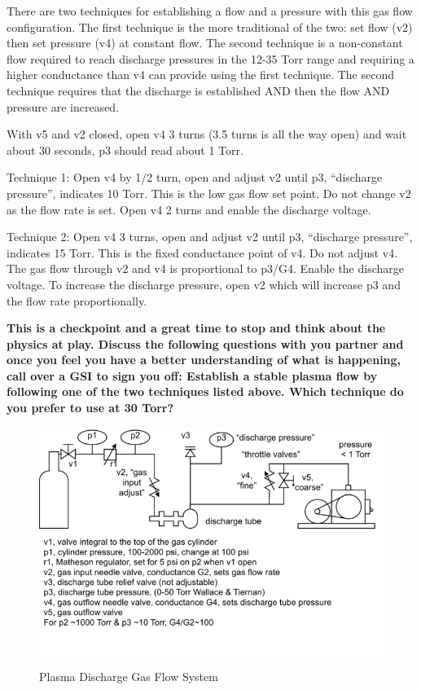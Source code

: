 \documentclass{../lab}
\begin{document}
There are two techniques for establishing a flow and a pressure with this gas flow configuration. The first technique is the more traditional of the two: set flow (v2) then set pressure (v4) at constant flow. The second technique is a non-constant flow required to reach discharge pressures in the 12-35 Torr range and requiring a higher conductance than v4 can provide using the first technique. The second technique requires that the discharge is established AND then the flow AND pressure are increased.

With v5 and v2 closed, open v4 3 turns (3.5 turns is all the way open) and wait about 30 seconds, p3 should read about 1 Torr.

Technique 1: Open v4 by 1/2 turn, open and adjust v2 until p3, ``discharge pressure'', indicates 10 Torr. This is the low gas flow set point. Do not change v2 as the flow rate is set. Open v4 2 turns and enable the discharge voltage.

Technique 2: Open v4 3 turns, open and adjust v2 until p3, ``discharge pressure'', indicates 15 Torr. This is the fixed conductance point of v4. Do not adjust v4. The gas flow through v2 and v4 is proportional to p3/G4. Enable the discharge voltage. To increase the discharge pressure, open v2 which will increase p3 and the flow rate proportionally.

\textbf{This is a checkpoint and a great time to stop and think about the physics at play. Discuss the following questions with you partner and once you feel you have a better understanding of what is happening, call over a GSI to sign you off:
Establish a stable plasma flow by following one of the two techniques listed above. Which technique do you prefer to use at 30 Torr?}

\begin{figure}[h]
    \centering
    \href{http://experimentationlab.berkeley.edu/sites/default/files/images/680px-Hall_diagram.png}{\includegraphics[width=0.8\linewidth]{images/680px-Hall_diagram.png}}
    \caption{Plasma Discharge Gas Flow System}
    \label{fig:680px-Hall_diagram}
\end{figure}
\end{document}
